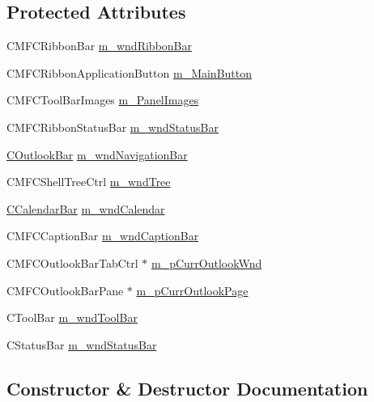 \subsection*{Protected Attributes}
\begin{DoxyCompactItemize}
\item 
C\+M\+F\+C\+Ribbon\+Bar \hyperlink{class_c_main_frame_a4e32dcc1214c1cc1dc84e4b65d813d14}{m\+\_\+wnd\+Ribbon\+Bar}
\item 
C\+M\+F\+C\+Ribbon\+Application\+Button \hyperlink{class_c_main_frame_a07959a072f4e0c828d26b178f6fd3bd1}{m\+\_\+\+Main\+Button}
\item 
C\+M\+F\+C\+Tool\+Bar\+Images \hyperlink{class_c_main_frame_adeaf09af6cba27e80fb5c225cec4a428}{m\+\_\+\+Panel\+Images}
\item 
C\+M\+F\+C\+Ribbon\+Status\+Bar \hyperlink{class_c_main_frame_a244ce6ad929a1cb6a2a109eecdafe726}{m\+\_\+wnd\+Status\+Bar}
\item 
\hyperlink{class_c_outlook_bar}{C\+Outlook\+Bar} \hyperlink{class_c_main_frame_a373ded7e5dd1fe95a7421bd6e385a1c8}{m\+\_\+wnd\+Navigation\+Bar}
\item 
C\+M\+F\+C\+Shell\+Tree\+Ctrl \hyperlink{class_c_main_frame_a681ffb32a0f664b09806be7da883073f}{m\+\_\+wnd\+Tree}
\item 
\hyperlink{class_c_calendar_bar}{C\+Calendar\+Bar} \hyperlink{class_c_main_frame_ad79f402fcb6d292fde67d37ad10ec7f3}{m\+\_\+wnd\+Calendar}
\item 
C\+M\+F\+C\+Caption\+Bar \hyperlink{class_c_main_frame_ae2938aa8a512610eccce5d37a3128f77}{m\+\_\+wnd\+Caption\+Bar}
\item 
C\+M\+F\+C\+Outlook\+Bar\+Tab\+Ctrl $\ast$ \hyperlink{class_c_main_frame_a115f4d41a1cd30c24f777b5b50d9ee20}{m\+\_\+p\+Curr\+Outlook\+Wnd}
\item 
C\+M\+F\+C\+Outlook\+Bar\+Pane $\ast$ \hyperlink{class_c_main_frame_a5bbdfede2f23d5277120adafbe635081}{m\+\_\+p\+Curr\+Outlook\+Page}
\item 
C\+Tool\+Bar \hyperlink{class_c_main_frame_a73024d794dce2fe918f6b117371c25fc}{m\+\_\+wnd\+Tool\+Bar}
\item 
C\+Status\+Bar \hyperlink{class_c_main_frame_ac01bafc03aee69cf982e6f029b4db6b0}{m\+\_\+wnd\+Status\+Bar}
\end{DoxyCompactItemize}


\subsection{Constructor \& Destructor Documentation}
\hypertarget{class_c_main_frame_af3e997aeae4148d2aaa4a1e1ae7bdd53}{}
